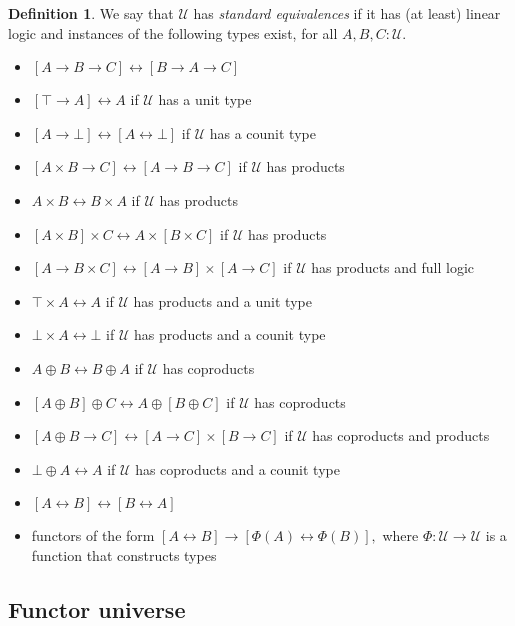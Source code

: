 \documentclass[a4paper]{article}
\theoremstyle{definition}
\newtheorem{definition}{Definition}[section]
\theoremstyle{remark}
\newcommand{\defn}{\emph}
\newcommand{\U}{\mathcal{U}}
\begin{document}
\begin{definition}
  We say that $\U$ has \defn{standard equivalences} if it has (at least) linear logic and instances
  of the following types exist, for all $A,B,C : \U.$
  \begin{itemize}
    \item $[A \to B \to C] \leftrightarrow [B \to A \to C]$
    \item $[\top \to A] \leftrightarrow A$ if $\U$ has a unit type
    \item $[A \to \bot] \leftrightarrow [A \leftrightarrow \bot]$ if $\U$ has a counit type
    \item $[A \times B \to C] \leftrightarrow [A \to B \to C]$ if $\U$ has products
    \item $A \times B \leftrightarrow B \times A$ if $\U$ has products
    \item $[A \times B] \times C \leftrightarrow A \times [B \times C]$ if $\U$ has products
    \item $[A \to B \times C] \leftrightarrow [A \to B] \times [A \to C]$ if $\U$ has products
    and full logic
    \item $\top \times A \leftrightarrow A$ if $\U$ has products and a unit type
    \item $\bot \times A \leftrightarrow \bot$ if $\U$ has products and a counit type
    \item $A \oplus B \leftrightarrow B \oplus A$ if $\U$ has coproducts
    \item $[A \oplus B] \oplus C \leftrightarrow A \oplus [B \oplus C]$ if $\U$ has coproducts
    \item $[A \oplus B \to C] \leftrightarrow [A \to C] \times [B \to C]$ if $\U$ has coproducts
    and products
    \item $\bot \oplus A \leftrightarrow A$ if $\U$ has coproducts and a counit type
    \item $[A \leftrightarrow B] \leftrightarrow [B \leftrightarrow A]$
    \item functors of the form $[A \leftrightarrow B] \to [\Phi(A) \leftrightarrow \Phi(B)],$ where
    $\Phi : \U \to \U$ is a function that constructs types
  \end{itemize}
\end{definition}

\subsection{Functor universe}
\label{sec:layer1-functor-universe}
\end{document}

